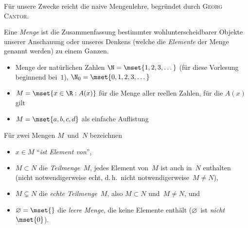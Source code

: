 \documentclass[a4paper]{article}
\begin{document}
Für unsere Zwecke reicht die naive Mengenlehre, begründet durch \textsc{Georg Cantor}.

\begin{definition}
    Eine \emph{Menge} ist die Zusammenfassung bestimmter wohlunterscheidbarer Objekte unserer Anschauung oder unseres Denkens (welche die \emph{Elemente} der Menge genannt werden) zu einem Ganzen.
\end{definition}

\begin{example}\leavevmode
    \begin{itemize}
        \item Menge der natürlichen Zahlen $\N = \mset{1, 2, 3, \dots}$ (für diese Vorlesung beginnend bei~$1$), $\N_0 = \mset{0, 1, 2, 3, \dots}$
        \item $M = \mset{x \in \R : A(x)}$ für die Menge aller reellen Zahlen, für die $A(x)$ gilt
        \item $M = \mset{a, b, c, d}$ als einfache Auflistung
    \end{itemize}
\end{example}

\begin{notation}
    Für zwei Mengen $M$~und~$N$ bezeichnen
    \begin{itemize}
        \item $x \in M$ "`\emph{ist Element von}"',
        \item $M \subset N$ die \emph{Teilmenge}~$M$, jedes Element von~$M$ ist auch in~$N$ enthalten (nicht notwendigerweise echt, d.\,h.\ nicht notwendigerweise~$M \neq N$),
        \item $M \subsetneq N$ die \emph{echte Teilmenge}~$M$, also $M \subset N$ und~$M \neq N$, und
        \item $\varnothing = \mset{}$ die \emph{leere Menge}, die keine Elemente enthält ($\varnothing$~ist \emph{nicht}~$\mset{0}$).
    \end{itemize}
\end{notation}
\end{document}
